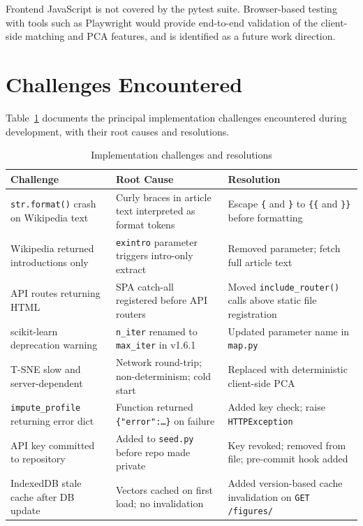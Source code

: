 \documentclass[11pt, a4paper]{report}
\begin{document}
Frontend JavaScript is not covered by the pytest suite. Browser-based testing with tools such as Playwright \citep{playwright2020} would provide end-to-end validation of the client-side matching and PCA features, and is identified as a future work direction.

\section{Challenges Encountered}

Table~\ref{tab:challenges} documents the principal implementation challenges encountered during development, with their root causes and resolutions.

\begin{table}[H]
  \centering
  \caption{Implementation challenges and resolutions}
  \label{tab:challenges}
  \begin{tabular}{p{3.8cm}p{3.8cm}p{4.7cm}}
    \toprule
    Challenge & Root Cause & Resolution \\
    \midrule
    \texttt{str.format()} crash on Wikipedia text & Curly braces in article text interpreted as format tokens & Escape \texttt{\{} and \texttt{\}} to \texttt{\{\{} and \texttt{\}\}} before formatting \\
    Wikipedia returned introductions only & \texttt{exintro} parameter triggers intro-only extract & Removed parameter; fetch full article text \\
    API routes returning HTML & SPA catch-all registered before API routers & Moved \texttt{include\_router()} calls above static file registration \\
    scikit-learn deprecation warning & \texttt{n\_iter} renamed to \texttt{max\_iter} in v1.6.1 & Updated parameter name in \texttt{map.py} \\
    T-SNE slow and server-dependent & Network round-trip; non-determinism; cold start & Replaced with deterministic client-side PCA \\
    \texttt{impute\_profile} returning error dict & Function returned \texttt{\{"error":\ldots\}} on failure & Added key check; raise \texttt{HTTPException} \\
    API key committed to repository & Added to \texttt{seed.py} before repo made private & Key revoked; removed from file; pre-commit hook added \\
    IndexedDB stale cache after DB update & Vectors cached on first load; no invalidation & Added version-based cache invalidation on \texttt{GET /figures/} \\
    \bottomrule
  \end{tabular}
\end{table}
\end{document}
